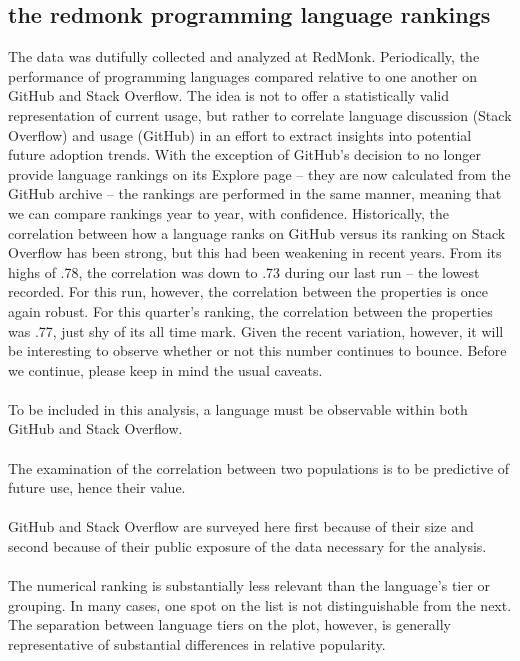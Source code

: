 \documentclass[a4paper, 12pt]{report}
\begin{document}
\begin{center}
\chapter{the redmonk programming language rankings} 
\end{center}
The data was dutifully collected and analyzed at RedMonk. Periodically, the performance of programming languages compared
relative to one another on GitHub and Stack Overflow. The idea is not to offer a statistically valid representation of current usage, 
but rather to correlate language discussion (Stack Overflow) and usage (GitHub) in an effort to extract insights into potential 
future adoption trends. With the exception of GitHub’s decision to no longer provide language rankings on its Explore page – they 
are now calculated from the GitHub archive – the rankings are performed in the same manner, meaning that we can compare
rankings year to year, with confidence.
Historically, the correlation between how a language ranks on GitHub versus its ranking on Stack Overflow has been strong, but 
this had been weakening in recent years. From its highs of .78, the correlation was down to .73 during our last run – the lowest 
recorded. For this run, however, the correlation between the properties is once again robust. For this quarter’s ranking, the
correlation between the properties was .77, just shy of its all time mark. Given the recent variation, however, it will be interesting 
to observe whether or not this number continues to bounce.
Before we continue, please keep in mind the usual caveats.
\\ \\ To be included in this analysis, a language must be observable within both GitHub and Stack Overflow.
\\ \\ The examination of the correlation between two populations is to be predictive of future use, hence their value.
\\ \\ GitHub and Stack Overflow are surveyed here first because of their size and second because of their public exposure of 
the data necessary for the analysis. 
\\ \\The numerical ranking is substantially less relevant than the language’s tier or grouping. In many cases, one spot on the 
list is not distinguishable from the next. The separation between language tiers on the plot, however, is generally 
representative of substantial differences in relative popularity.
\end{document}
